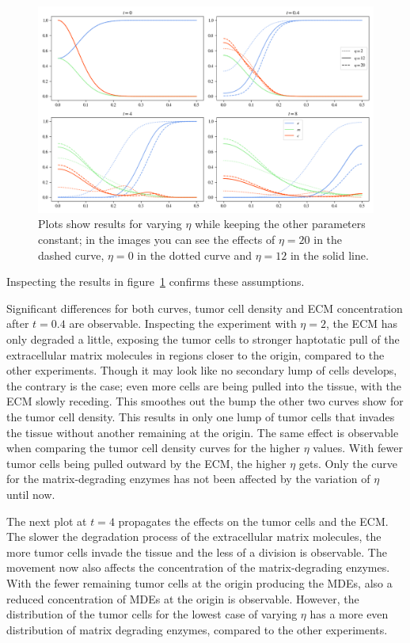 \begin{figure}[h!]
 \centering
 \includegraphics[width=\textwidth]{resources/images/eta_variation.png}
 \caption{Plots show results for varying $\eta$ while keeping the other parameters constant; in the images you can see the effects of $\eta=20$ in the dashed curve, $\eta=0$ in the dotted curve and $\eta=12$ in the solid line.}
 \label{fig:eta_variation}
\end{figure}
Inspecting the results in figure~\ref{fig:eta_variation} confirms these assumptions.

Significant differences for both curves, tumor cell density and ECM concentration after $t=0.4$ are observable. Inspecting the experiment with $\eta=2$, the ECM has only degraded a little, exposing the tumor cells to stronger haptotatic pull of the extracellular matrix molecules in regions closer to the origin, compared to the other experiments. Though it may look like no secondary lump of cells develops, the contrary is the case; even more cells are being pulled into the tissue, with the ECM slowly receding. This smoothes out the bump the other two curves show for the tumor cell density. This results in only one lump of tumor cells that invades the tissue without another remaining at the origin. The same effect is observable when comparing the tumor cell density curves for the higher $\eta$ values. With fewer tumor cells being pulled outward by the ECM, the higher $\eta$ gets. Only the curve for the matrix-degrading enzymes has not been affected by the variation of $\eta$ until now.

The next plot at $t=4$ propagates the effects on the tumor cells and the ECM. The slower the degradation process of the extracellular matrix molecules, the more tumor cells invade the tissue and the less of a division is observable. The movement now also affects the concentration of the matrix-degrading enzymes. With the fewer remaining tumor cells at the origin producing the MDEs, also a reduced concentration of MDEs at the origin is observable. However, the distribution of the tumor cells for the lowest case of varying $\eta$ has a more even distribution of matrix degrading enzymes, compared to the other experiments.

